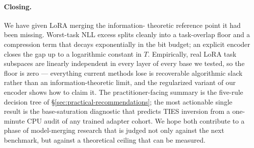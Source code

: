 \paragraph{Closing.} We have given LoRA merging the information-
theoretic reference point it had been missing. Worst-task NLL excess
splits cleanly into a task-overlap floor and a compression term that
decays exponentially in the bit budget; an explicit encoder closes
the gap up to a logarithmic constant in $T$. Empirically, real LoRA
task subspaces are linearly independent in every layer of every base
we tested, so the floor is zero --- everything current methods lose
is recoverable algorithmic slack rather than an information-theoretic
limit, and the regularized variant of our encoder shows how to claim
it. The practitioner-facing summary is the five-rule decision tree of
\S\ref{sec:practical-recommendations}; the most actionable single
result is the base-saturation diagnostic that predicts TIES inversion
from a one-minute CPU audit of any trained adapter cohort. We hope
both contribute to a phase of model-merging research that is judged
not only against the next benchmark, but against a theoretical
ceiling that can be measured.
